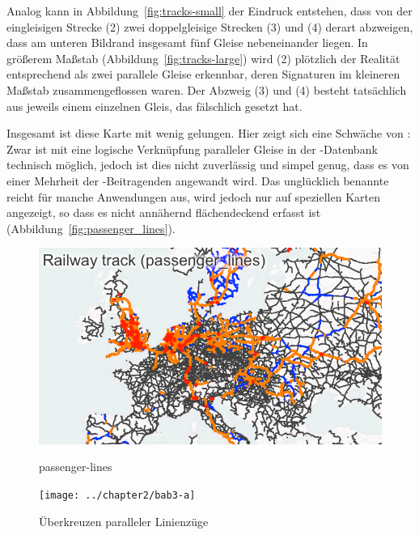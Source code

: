 \documentclass[../main/thesis.tex]{subfiles}
\begin{document}
Analog kann in Abbildung~\ref{fig:tracks-small} der Eindruck entstehen, dass von der eingleisigen Strecke (2) zwei doppelgleisige Strecken (3) und (4) derart abzweigen, dass am unteren Bildrand insgesamt fünf Gleise nebeneinander liegen. In größerem Maßstab (Abbildung~\ref{fig:tracks-large}) wird (2) plötzlich der Realität entsprechend als zwei parallele Gleise erkennbar, deren Signaturen im kleineren Maßstab zusammengeflossen waren. Der Abzweig (3) und (4) besteht tatsächlich aus jeweils einem einzelnen Gleis, das fälschlich  gesetzt hat.

Insgesamt ist diese Karte mit  wenig gelungen. Hier zeigt sich eine Schwäche von \osm: Zwar ist mit  eine logische Verknüpfung paralleler Gleise in der \osm-Datenbank technisch möglich, jedoch ist dies nicht zuverlässig und simpel genug, dass es von einer Mehrheit der \osm-Beitragenden angewandt wird. Das unglücklich benannte  reicht für manche Anwendungen aus, wird jedoch nur auf speziellen Karten angezeigt,
so dass es nicht annähernd flächendeckend erfasst ist (Abbildung~\ref{fig:passenger_lines}).

\begin{figure}[ht]
  \begin{minipage}{.5\linewidth}
    \centering
    \includegraphics[width=\ScaleIfNeeded]{../chapter2/passenger_lines-europe}
    \caption{passenger-lines}\label{fig:passenger_lines}
  \end{minipage}%
  \begin{minipage}{.5\linewidth}
    \centering
    \texttt{[image: ../chapter2/bab3-a]}
    \caption{Überkreuzen paralleler Linienzüge}\label{fig:bab3-b}
  \end{minipage}
\end{figure}
\end{document}
